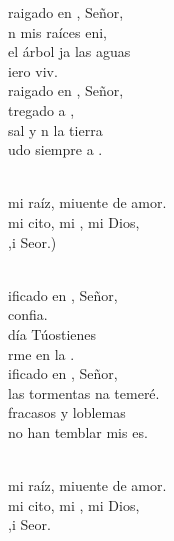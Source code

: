 \documentclass[12pt]{article}
\begin{document}
\begin{multicols*}{2}
\begin{cancion}[Tú, mi raíz][Ixcís]%
	raigado en , Señor,\\
	n mis raíces eni,\\
	 el árbol ja las aguas\\
	iero viv.\\
\jump
	raigado en , Señor,\\
	tregado a ,\\
	 sal y n la tierra\\
	udo siempre a .\\\jump\\
	\begin{chorus}%
	 mi raíz, miuente de amor. \\
	 mi cito, mi , mi Dios, \\
	,i Seor.) \\
	\end{chorus}%
	\jump\\
	ificado en , Señor,\\
	 confia. \\
	 día Túostienes \\
	rme en la .\\
\jump
	ificado en , Señor,\\
	 las tormentas na temeré.\\
	fracasos y loblemas\\
	no han temblar mis es. \\\jump\\
	\begin{chorus}%
	 mi raíz, miuente de amor. \\
	 mi cito, mi , mi Dios, \\
	,i Seor.   \\
	\end{chorus}%
	\jump\\
\end{cancion}%


\end{multicols*}
\end{document}
